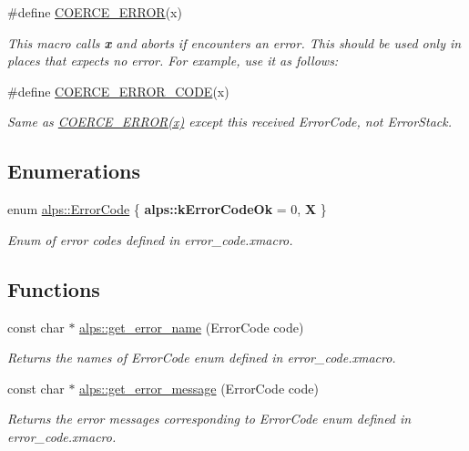 \begin{DoxyCompactItemize}
\#define \hyperlink{group__ERRORCODES_gaffe5682593fcb16d1afef651612f5909}{C\+O\+E\+R\+C\+E\+\_\+\+E\+R\+R\+OR}(x)
\begin{DoxyCompactList}\small\item\em This macro calls {\bfseries x} and aborts if encounters an error. This should be used only in places that expects no error. For example, use it as follows\+: \end{DoxyCompactList}\item 
\#define \hyperlink{group__ERRORCODES_ga39492dd44529de33e90a87050542ab6c}{C\+O\+E\+R\+C\+E\+\_\+\+E\+R\+R\+O\+R\+\_\+\+C\+O\+DE}(x)
\begin{DoxyCompactList}\small\item\em Same as \hyperlink{group__ERRORCODES_gaffe5682593fcb16d1afef651612f5909}{C\+O\+E\+R\+C\+E\+\_\+\+E\+R\+R\+O\+R(x)} except this received Error\+Code, not Error\+Stack. \end{DoxyCompactList}\end{DoxyCompactItemize}
\subsection*{Enumerations}
\begin{DoxyCompactItemize}
\item 
enum \hyperlink{group__ERRORCODES_ga6263a3c9a0b8d36aea21cdd835ac99fe}{alps\+::\+Error\+Code} \{ {\bfseries alps\+::k\+Error\+Code\+Ok} = 0, 
{\bfseries X}
 \}\begin{DoxyCompactList}\small\item\em Enum of error codes defined in error\+\_\+code.\+xmacro. \end{DoxyCompactList}
\end{DoxyCompactItemize}
\subsection*{Functions}
\begin{DoxyCompactItemize}
\item 
const char $\ast$ \hyperlink{group__ERRORCODES_ga1f9f68d3e1a7d17985e648ee002ff930}{alps\+::get\+\_\+error\+\_\+name} (Error\+Code code)\hypertarget{group__ERRORCODES_ga1f9f68d3e1a7d17985e648ee002ff930}{}\label{group__ERRORCODES_ga1f9f68d3e1a7d17985e648ee002ff930}

\begin{DoxyCompactList}\small\item\em Returns the names of Error\+Code enum defined in error\+\_\+code.\+xmacro. \end{DoxyCompactList}\item 
const char $\ast$ \hyperlink{group__ERRORCODES_gac002d42f81c3c276057ce14abe44425d}{alps\+::get\+\_\+error\+\_\+message} (Error\+Code code)\hypertarget{group__ERRORCODES_gac002d42f81c3c276057ce14abe44425d}{}\label{group__ERRORCODES_gac002d42f81c3c276057ce14abe44425d}

\begin{DoxyCompactList}\small\item\em Returns the error messages corresponding to Error\+Code enum defined in error\+\_\+code.\+xmacro. \end{DoxyCompactList}\end{DoxyCompactItemize}
